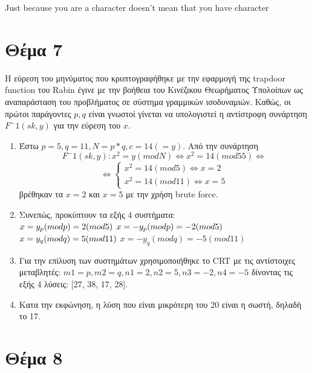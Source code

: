\documentclass[a4paper, 11pt]{article}
\newcommand{\lt}{\latintext}
\begin{document}
{\lt  Just because you are a character doesn't mean that you have character}
\section*{Θέμα 7}


Η εύρεση του μηνύματος που κρυπτογραφήθηκε με την εφαρμογή της {\lt trapdoor function} του {\lt Rabin} έγινε με την βοήθεια του Κινέζικου Θεωρήματος Υπολοίπων ως αναπαράσταση του προβλήματος σε σύστημα γραμμικών ισοδυναμιών. Καθώς, οι πρώτοι παράγοντες $p, q$ είναι γνωστοί γίνεται να υπολογιστεί η αντίστροφη συνάρτηση $ F^-1(sk, y) $ για την εύρεση του $x$.

\begin{enumerate}

\item Έστω $ p = 5, q = 11, N = p * q, c = 14 (=y) $. Από την συνάρτηση
\[ F^-1(sk,y): x^2 = y (mod N) \Leftrightarrow x^ 2 = 14 (mod 55) \Leftrightarrow \]
\[ \Leftrightarrow \left\{
	\begin{array}{ll}
		x^2 = 14 (mod 5) \Leftrightarrow x = 2\\
		x^2 = 14 (mod 11) \Leftrightarrow x = 5
	\end{array}
\right.\]
βρέθηκαν τα $ x = 2 $ και $ x =5 $ με την χρήση {\lt brute force}.

\item Συνεπώς, προκύπτουν τα εξής 4 συστήματα: \\
$ x = y_p (mod p) = 2 (mod 5) \\ $
$ x = -y_p (mod p) = -2 (mod 5) \\ $
$ x = y_q (mod q) = 5 (mod 11) \\ $
$ x = -y_q (mod q) = -5 (mod 11)$

\item Για την επίλυση των συστημάτων χρησιμοποιήθηκε το {\lt CRT} με τις αντίστοιχες μεταβλητές: $ m1 = p, m2 = q, n1 = 2 , n2 = 5, n3 = -2, n4 = -5 $ δίνοντας τις εξής 4 λύσεις: [27, 38, 17, 28].

\item Κατα την εκφώνηση, η λύση που είναι μικρότερη του 20 είναι η σωστή, δηλαδή το 17.

\end{enumerate}
\newpage

\section*{Θέμα 8}
\end{document}
